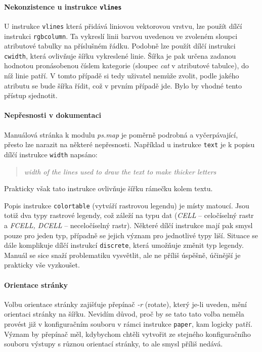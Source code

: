 \documentclass[a4paper,12pt,draft]{article}
\newcommand{\modul}[1]{\emph{#1}}
\newcommand{\instr}[1]{\lstinline[style=psmapInline]|#1|}
\begin{document}
\paragraph*{Nekonzistence u instrukce \instr{vlines}}
\label{sec:psmap:vlines}
U instrukce \instr{vlines} která přidává liniovou vektorovou vrstvu, lze použít dílčí instrukci \instr{rgbcolumn}. Ta vykreslí   linii barvou uvedenou ve zvoleném sloupci atributové tabulky na příslušném řádku. Podobně lze použít dílčí instrukci \instr{cwidth}, která ovlivňuje šířku vykreslené linie. Šířka je pak určena zadanou hodnotou pronásobenou číslem kategorie (sloupec \emph{cat} v atributové tabulce), do níž linie patří. V tomto případě si tedy uživatel nemůže zvolit, podle jakého atributu se bude šířka řídit, což v prvním případě jde. Bylo by vhodné tento přístup sjednotit. 

\paragraph*{Nepřesnosti v dokumentaci}
\label{sec:psmap:manual}
Manuálová stránka \cite{manual} k modulu \modul{ps.map} je poměrně podrobná a vyčerpávající, přesto lze narazit na některé nepřesnosti. Například u instrukce \instr{text} je k popisu dílčí instrukce \instr{width} napsáno:
 \begin{quotation}\it
width of the lines used to draw the text to make thicker letters
\end{quotation}
Prakticky však tato instrukce ovlivňuje šířku rámečku kolem textu.

Popis instrukce \instr{colortable} (vytváří rastrovou legendu) je místy matoucí. Jsou totiž dva typy rastrové legendy, což záleží na typu dat (\emph{CELL} -- celočíselný rastr a \emph{FCELL, DCELL} -- neceločíselný rastr). Některé dílčí instrukce mají pak smysl pouze pro jeden typ, případně se jejich význam pro jednotlivé typy liší. Situace se dále komplikuje dílčí instrukcí \instr{discrete}, která umožňuje změnit typ legendy. Manuál se sice snaží problematiku vysvětlit, ale ne příliš úspěšně, účinější je prakticky vše vyzkoušet.

\paragraph*{Orientace stránky}
Volbu orientace stránky zajišťuje přepínač \emph{-r} (rotate), který je-li uveden, mění orientaci stránky na šířku. Nevidím důvod, proč by se tato tato volba neměla provést již v konfiguračním souboru v rámci instrukce \instr{paper}, kam logicky patří. Význam by přepínač měl, kdybychom chtěli vytvořit ze stejného konfiguračního souboru výstupy s různou orientací stránky, to ale smysl příliš nedává.
\end{document}
